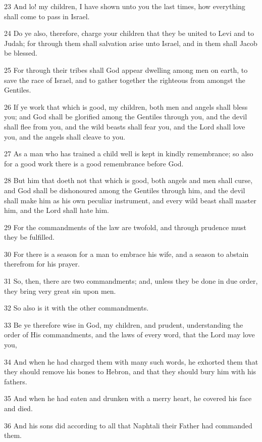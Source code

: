 \par 23 And lo! my children, I have shown unto you the last times, how everything shall come to pass in Israel.

\par 24 Do ye also, therefore, charge your children that they be united to Levi and to Judah; for through them shall salvation arise unto Israel, and in them shall Jacob be blessed.

\par 25 For through their tribes shall God appear dwelling among men on earth, to save the race of Israel, and to gather together the righteous from amongst the Gentiles.

\par 26 If ye work that which is good, my children, both men and angels shall bless you; and God shall be glorified among the Gentiles through you, and the devil shall flee from you, and the wild beasts shall fear you, and the Lord shall love you, and the angels shall cleave to you.

\par 27 As a man who has trained a child well is kept in kindly remembrance; so also for a good work there is a good remembrance before God.

\par 28 But him that doeth not that which is good, both angels and men shall curse, and God shall be dishonoured among the Gentiles through him, and the devil shall make him as his own peculiar instrument, and every wild beast shall master him, and the Lord shall hate him.

\par 29 For the commandments of the law are twofold, and through prudence must they be fulfilled.

\par 30 For there is a season for a man to embrace his wife, and a season to abstain therefrom for his prayer.

\par 31 So, then, there are two commandments; and, unless they be done in due order, they bring very great sin upon men.

\par 32 So also is it with the other commandments.

\par 33 Be ye therefore wise in God, my children, and prudent, understanding the order of His commandments, and the laws of every word, that the Lord may love you,

\par 34 And when he had charged them with many such words, he exhorted them that they should remove his bones to Hebron, and that they should bury him with his fathers.

\par 35 And when he had eaten and drunken with a merry heart, he covered his face and died.

\par 36 And his sons did according to all that Naphtali their Father had commanded them.



